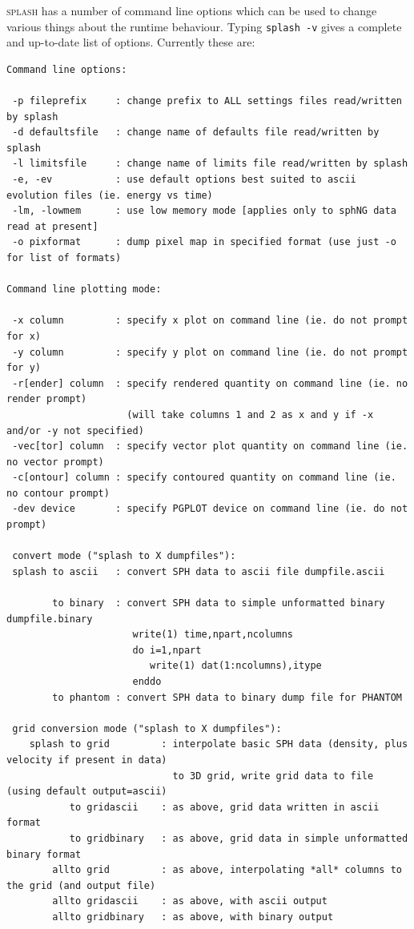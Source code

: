 \documentclass[a4paper,10pt]{article}
\newcommand{\splash}{\textsc{splash }}
\begin{document}
 \splash has a number of command line options which can be used to change various things about the runtime behaviour. Typing \verb+splash -v+ gives a complete and up-to-date list of options. Currently these are:
\begin{verbatim}
Command line options:

 -p fileprefix     : change prefix to ALL settings files read/written by splash 
 -d defaultsfile   : change name of defaults file read/written by splash
 -l limitsfile     : change name of limits file read/written by splash
 -e, -ev           : use default options best suited to ascii evolution files (ie. energy vs time)
 -lm, -lowmem      : use low memory mode [applies only to sphNG data read at present]
 -o pixformat      : dump pixel map in specified format (use just -o for list of formats)

Command line plotting mode:

 -x column         : specify x plot on command line (ie. do not prompt for x)
 -y column         : specify y plot on command line (ie. do not prompt for y)
 -r[ender] column  : specify rendered quantity on command line (ie. no render prompt)
                     (will take columns 1 and 2 as x and y if -x and/or -y not specified)
 -vec[tor] column  : specify vector plot quantity on command line (ie. no vector prompt)
 -c[ontour] column : specify contoured quantity on command line (ie. no contour prompt)
 -dev device       : specify PGPLOT device on command line (ie. do not prompt)

 convert mode ("splash to X dumpfiles"): 
 splash to ascii   : convert SPH data to ascii file dumpfile.ascii

        to binary  : convert SPH data to simple unformatted binary dumpfile.binary 
                      write(1) time,npart,ncolumns
                      do i=1,npart
                         write(1) dat(1:ncolumns),itype
                      enddo
        to phantom : convert SPH data to binary dump file for PHANTOM

 grid conversion mode ("splash to X dumpfiles"): 
    splash to grid         : interpolate basic SPH data (density, plus velocity if present in data)
                             to 3D grid, write grid data to file (using default output=ascii)
           to gridascii    : as above, grid data written in ascii format
           to gridbinary   : as above, grid data in simple unformatted binary format
        allto grid         : as above, interpolating *all* columns to the grid (and output file)
        allto gridascii    : as above, with ascii output
        allto gridbinary   : as above, with binary output


\end{verbatim}
\end{document}
